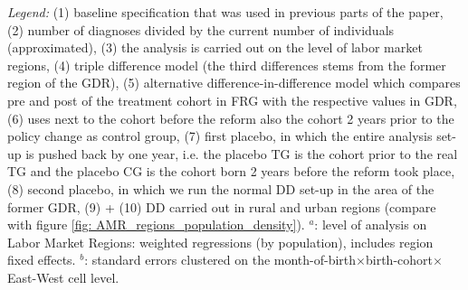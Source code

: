 \begin{landscape}
\begin{table}[htbp]
\begin{minipage}{0.87\linewidth}
		\newline \emph{Legend:} (1) baseline specification that was used in previous parts of the paper, (2) number of diagnoses divided by the current number of individuals (approximated), (3) the analysis is carried out on the level of labor market regions, (4) triple difference model (the third differences stems from the former region of the GDR), (5) alternative difference-in-difference model which compares pre and post of the treatment cohort in FRG with the respective values in GDR, (6) uses next to the cohort before the reform also the cohort 2 years prior to the policy change as control group, (7) first placebo, in which the entire analysis set-up is pushed back by one year, i.e. the placebo TG is the cohort prior to the real TG and the placebo CG is the cohort born 2 years before the reform took place, (8) second placebo, in which we run the normal DD set-up in the area of the former GDR, (9) + (10)  DD carried out in rural and urban regions (compare with figure \ref{fig: AMR_regions_population_density}). \newline
		\hspace{10 pt}$^a$: level of analysis on Labor Market Regions: weighted regressions (by population), includes region fixed effects.\newline
		\hspace{10 pt}$^b$: standard errors clustered on the month-of-birth$\times$birth-cohort$\times$East-West cell level.
	\end{minipage}
\end{table} 
	\vspace*{\fill}\clearpage
\end{landscape}






